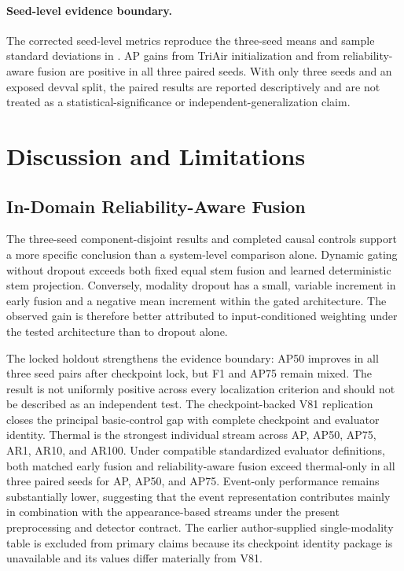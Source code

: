 \paragraph{Seed-level evidence boundary.}
The corrected seed-level metrics reproduce the three-seed means and sample standard deviations in . AP gains from TriAir initialization and from reliability-aware fusion are positive in all three paired seeds. With only three seeds and an exposed devval split, the paired results are reported descriptively and are not treated as a statistical-significance or independent-generalization claim.

\section{Discussion and Limitations}
\subsection{In-Domain Reliability-Aware Fusion}
The three-seed component-disjoint results and completed causal controls support a more specific conclusion than a system-level comparison alone. Dynamic gating without dropout exceeds both fixed equal stem fusion and learned deterministic stem projection. Conversely, modality dropout has a small, variable increment in early fusion and a negative mean increment within the gated architecture. The observed gain is therefore better attributed to input-conditioned weighting under the tested architecture than to dropout alone.

The locked holdout strengthens the evidence boundary: AP50 improves in all three seed pairs after checkpoint lock, but F1 and AP75 remain mixed. The result is not uniformly positive across every localization criterion and should not be described as an independent test. The checkpoint-backed V81 replication closes the principal basic-control gap with complete checkpoint and evaluator identity. Thermal is the strongest individual stream across AP, AP50, AP75, AR1, AR10, and AR100. Under compatible standardized evaluator definitions, both matched early fusion and reliability-aware fusion exceed thermal-only in all three paired seeds for AP, AP50, and AP75. Event-only performance remains substantially lower, suggesting that the event representation contributes mainly in combination with the appearance-based streams under the present preprocessing and detector contract. The earlier author-supplied single-modality table is excluded from primary claims because its checkpoint identity package is unavailable and its values differ materially from V81.

